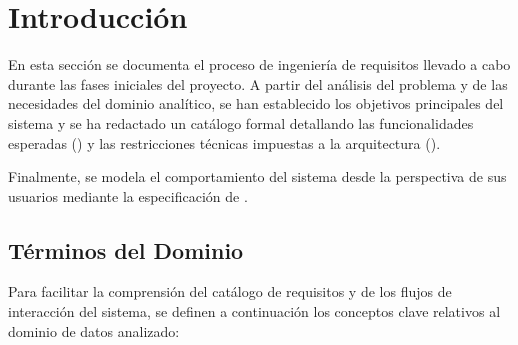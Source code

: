 
\section{Introducción}
En esta sección se documenta el proceso de ingeniería de requisitos llevado a
cabo durante las fases iniciales del proyecto. A partir del análisis del
problema y de las necesidades del dominio analítico, se han establecido los
objetivos principales del sistema y se ha redactado un catálogo formal
detallando las funcionalidades esperadas () y las restricciones
técnicas impuestas a la arquitectura ().

Finalmente, se modela el comportamiento del sistema desde la perspectiva de sus
usuarios mediante la especificación de .

\subsection{Términos del Dominio}
Para facilitar la comprensión del catálogo de requisitos y de los flujos de
interacción del sistema, se definen a continuación los conceptos clave
relativos al dominio de datos analizado:

